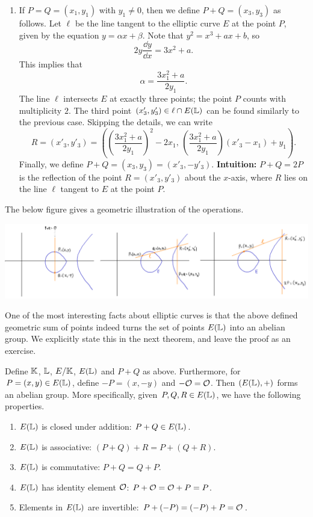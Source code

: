 \begin{defn}
\begin{enumerate}[(1)]
        \item If $P = Q = (x_1, y_1)$ with $y_1 \neq 0$, then we define 
        $P + Q = (x_3, y_3)$ as follows. Let $\ell$ be the line tangent 
        to the elliptic curve $E$ at the point $P$, given by the equation 
        $y = \alpha x + \beta$. Note that $y^2 = x^3 + ax + b$, so 
        \[ 2y\frac{\dd y}{\dd x} = 3x^2 + a. \] 
        This implies that 
        \[ \alpha = \frac{3x_1^2 + a}{2y_1}. \] 
        The line $\ell$ intersects $E$ at exactly three points; the point $P$ 
        counts with multiplicity $2$. The third point $(x'_3, y'_3) \in \ell 
        \cap E(\mathbb{L})$ can be found similarly to the previous case. Skipping 
        the details, we can write 
        \[ R = (x'_3, y'_3) = \left( \left( \frac{3x_1^2+a}{2y_1} \right)^{\!2} 
        - 2x_1,\, \left( \frac{3x_1^2+a}{2y_1} \right) (x'_3 - x_1) + y_1 \right). \] 
        Finally, we define $P + Q = (x_3, y_3) = (x'_3, -y'_3)$. \textbf{Intuition:} 
        $P + Q = 2P$ is the reflection of the point $R = (x'_3, y'_3)$ about the 
        $x$-axis, where $R$ lies on the line $\ell$ tangent to $E$ at the point $P$. 
    \end{enumerate}
\end{defn}
The below figure gives a geometric illustration of the operations. 
\begin{center}
    \includegraphics[width=\textwidth]{Images/ec_group_law.png}
\end{center}
One of the most interesting facts about elliptic curves is that the above 
defined geometric sum of points indeed turns the set of points $E(\mathbb{L})$ 
into an abelian group. We explicitly state this in the next theorem, and leave 
the proof as an exercise. 

\begin{thm}
    Define $\mathbb{K}$, $\mathbb{L}$, $E/\mathbb{K}$, $E(\mathbb{L})$ and $P + Q$ as above. Furthermore, 
    for $P = (x, y) \in E(\mathbb{L})$, define $-P = (x, -y)$ and $-{\cal O} = {\cal O}$. 
    Then $(E(\mathbb{L}), +)$ forms an abelian group. More specifically, 
    given $P, Q, R \in E(\mathbb{L})$, we have the following properties. 
    \begin{enumerate}[(1)]
        \item $E(\mathbb{L})$ is closed under addition: $P + Q \in E(\mathbb{L})$. 
        \item $E(\mathbb{L})$ is associative: $(P + Q) + R = P + (Q + R)$. 
        \item $E(\mathbb{L})$ is commutative: $P + Q = Q + P$.
        \item $E(\mathbb{L})$ has identity element ${\cal O}$: $P + {\cal O} = {\cal O} + P = P$.
        \item Elements in $E(\mathbb{L})$ are invertible: $P + (-P) = (-P) + P = {\cal O}$. 
    \end{enumerate}
\end{thm}

